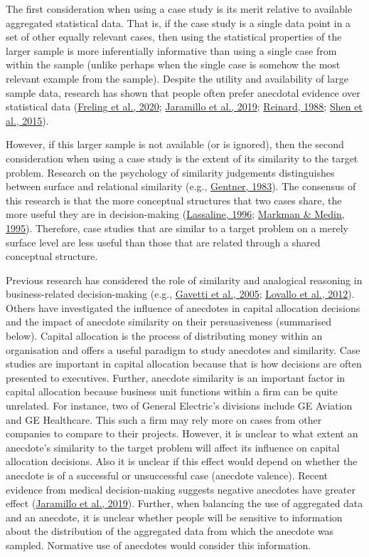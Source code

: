 \documentclass[
  man, donotrepeattitle,floatsintext]{apa7}
\theoremstyle{definition}
\theoremstyle{definition}
\theoremstyle{definition}
\theoremstyle{definition}
\theoremstyle{remark}
\begin{document}
The first consideration when using a case study is its merit relative to
available aggregated statistical data. That is, if the case study is a single
data point in a set of other equally relevant cases, then using the statistical
properties of the larger sample is more inferentially informative than using a
single case from within the sample (unlike perhaps when the single case is
somehow the most relevant example from the sample). Despite the utility and
availability of large sample data, research has shown that people often prefer
anecdotal evidence over statistical data (\protect\hyperlink{ref-freling2020}{Freling et al., 2020}; \protect\hyperlink{ref-jaramillo2019}{Jaramillo et al., 2019}; \protect\hyperlink{ref-reinard1988}{Reinard, 1988}; \protect\hyperlink{ref-shen2015}{Shen et al., 2015}).

However, if this larger sample is not available (or is ignored), then the second
consideration when using a case study is the extent of its similarity to the
target problem. Research on the psychology of similarity judgements
distinguishes between surface and relational similarity (e.g., \protect\hyperlink{ref-gentner1983}{Gentner, 1983}).
The consensus of this research is that the more conceptual structures that two
cases share, the more useful they are in decision-making (\protect\hyperlink{ref-lassaline1996}{Lassaline, 1996}; \protect\hyperlink{ref-markman1995}{Markman \& Medin, 1995}). Therefore, case studies that are similar to a target problem on
a merely surface level are less useful than those that are related through a
shared conceptual structure.

Previous research has considered the role of similarity and analogical reasoning
in business-related decision-making (e.g., \protect\hyperlink{ref-gavetti2005}{Gavetti et al., 2005}; \protect\hyperlink{ref-lovallo2012}{Lovallo et al., 2012}). Others
have investigated the influence of anecdotes in capital allocation decisions and
the impact of anecdote similarity on their persuasiveness (summarised below).
Capital allocation is the process of distributing money within an organisation
and offers a useful paradigm to study anecdotes and similarity. Case studies are
important in capital allocation because that is how decisions are often
presented to executives. Further, anecdote similarity is an important factor in
capital allocation because business unit functions within a firm can be quite
unrelated. For instance, two of General Electric's divisions include GE Aviation
and GE Healthcare. This such a firm may rely more on cases from other companies
to compare to their projects. However, it is unclear to what extent an
anecdote's similarity to the target problem will affect its influence on capital
allocation decisions. Also it is unclear if this effect would depend on whether
the anecdote is of a successful or unsuccessful case (anecdote valence). Recent
evidence from medical decision-making suggests negative anecdotes have greater
effect (\protect\hyperlink{ref-jaramillo2019}{Jaramillo et al., 2019}). Further, when balancing the use of aggregated data and
an anecdote, it is unclear whether people will be sensitive to information about
the distribution of the aggregated data from which the anecdote was sampled.
Normative use of anecdotes would consider this information.
\end{document}
